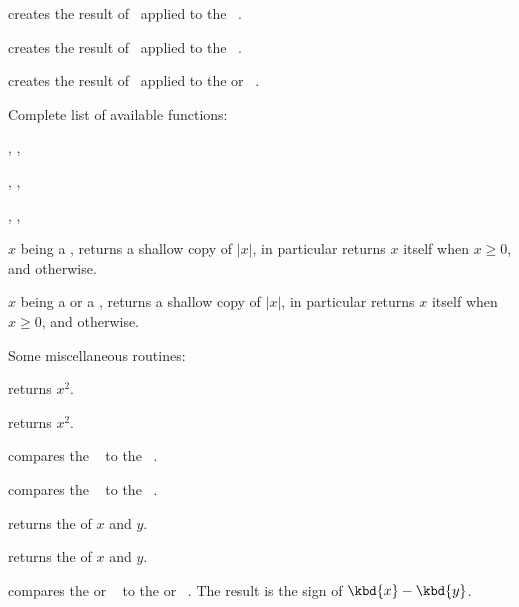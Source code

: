  creates the result of \op\ applied to the
~.

 creates the result of \op\ applied to the
~.

 creates the result of \op\ applied to the
 or ~.

\noindent Complete list of available functions:

, , 

, , 

, , 

 $x$ being a , returns a shallow copy of
$|x|$, in particular returns $x$ itself when $x \geq 0$, and 
otherwise.

 $x$ being a  or a , returns
a shallow copy of $|x|$, in particular returns $x$ itself when $x \geq 0$, and
 otherwise.


\noindent Some miscellaneous routines:

 returns $x^2$.

 returns $x^2$.


 compares the ~ to the
~.

 compares the ~ to the
~.



 returns the  of $x$ and $y$.




 returns the  of $x$ and $y$.

\smallskip

 compares the  or ~
to the  or ~. The result is the sign of
$\kbd{x}-\kbd{y}$.

